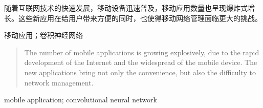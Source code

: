 
\begin{zhaiyao}
随着互联网技术的快速发展，移动设备迅速普及，移动应用数量也呈现爆炸式增长。这些新应用在给用户带来方便的同时，也使得移动网络管理面临更大的挑战。
\\
\end{zhaiyao}

\begin{flushleft}
\begin{guanjianci}
移动应用；卷积神经网络
\end{guanjianci}
\end{flushleft}

\begin{abstract}
The number of mobile applications is growing explosively, due to the rapid development of the Internet and the widespread of the mobile device. The new applications bring not only the convenience, but also the difficulty to network management. 
\\
\end{abstract}

\begin{flushleft}
\begin{keywords}
mobile application; convolutional neural network
\end{keywords}
\end{flushleft}

